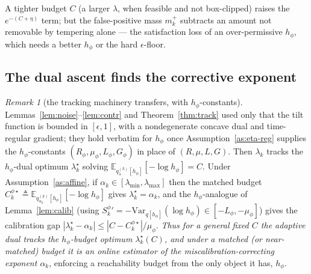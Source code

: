 \documentclass[11pt]{article}
\newcommand{\E}{\mathbb{E}}
\newcommand{\Var}{\mathrm{Var}}
\newcommand{\lmin}{\lambda_{\min}}
\newcommand{\lmax}{\lambda_{\max}}
\theoremstyle{plain}
\theoremstyle{definition}
\theoremstyle{remark}
\newtheorem{remark}{Remark}
\begin{document}
A tighter budget $C$ (a larger $\lambda$, when feasible and not box-clipped) raises the
$e^{-(C+\eta)}$ term; but the false-positive mass $m^+_k$ subtracts an amount not removable by
tempering alone --- the satisfaction loss of an over-permissive $h_\phi$, which needs a better
$h_\phi$ or the hard $\epsilon$-floor.

\subsection{The dual ascent finds the corrective exponent}

\begin{remark}[the tracking machinery transfers, with $h_\phi$-constants]
\label{rem:eta-bridge}
Lemmas~\ref{lem:noise}--\ref{lem:contr} and Theorem~\ref{thm:track} used only that the tilt
function is bounded in $[\epsilon,1]$, with a nondegenerate concave dual and time-regular
gradient; they hold verbatim for $h_\phi$ once Assumption~\ref{as:eta-reg} supplies the
$h_\phi$-constants $(R_\phi,\mu_\phi,L_\phi,G_\phi)$ in place of $(R,\mu,L,G)$. Then $\lambda_k$
tracks the $h_\phi$-dual optimum $\lambda^\star_k$ solving $\E_{q^{(k)}_\lambda[h_\phi]}[-\log h_\phi]=C$.
Under Assumption~\ref{as:affine}, if $\alpha_k\in[\lmin,\lmax]$ then the matched budget
$C^{\phi\star}_k\triangleq\E_{q^{(k)}_{\alpha_k}[h_\phi]}[-\log h_\phi]$ gives $\lambda^\star_k=\alpha_k$,
and the $h_\phi$-analogue of Lemma~\ref{lem:calib} (using $S^\phi_k{}'=-\Var_{q[h_\phi]}(\log h_\phi)\in[-L_\phi,-\mu_\phi]$)
gives the calibration gap $|\lambda^\star_k-\alpha_k|\le|C-C^{\phi\star}_k|/\mu_\phi$. \emph{Thus
for a general fixed $C$ the adaptive dual tracks the $h_\phi$-budget optimum $\lambda^\star_k(C)$,
and under a matched (or near-matched) budget it is an online estimator of the
miscalibration-correcting exponent $\alpha_k$}, enforcing a reachability budget from the only
object it has, $h_\phi$.
\end{remark}
\end{document}
